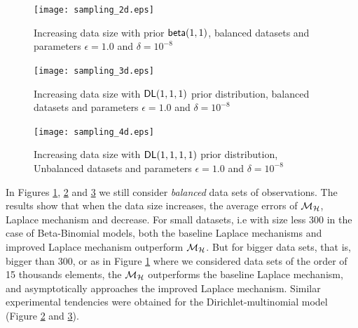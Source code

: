 \documentclass{article}
\begin{document}
\begin{figure}
\begin{center}
\centering
    \texttt{[image: sampling\_2d.eps]}
\caption{Increasing data size with prior $\mathsf{beta}(1,1)$, balanced datasets and parameters $\epsilon = 1.0$ and $\delta = 10^{-8}$}
\label{fig_vs_datasize_2d}
\end{center}
\end{figure}

\begin{figure}[ht]
\begin{center}
\centering
     \texttt{[image: sampling\_3d.eps]}   
\caption{Increasing data size with $\mathsf{DL}(1,1,1)$ prior distribution, balanced datasets and parameters $\epsilon = 1.0$ and $\delta = 10^{-8}$}
\label{fig_vs_datasize_3d}
\end{center}
\end{figure}

\begin{figure}[ht]
\begin{center}
\centering
     \texttt{[image: sampling\_4d.eps]}    
\caption{Increasing data size with $\mathsf{DL}(1,1,1,1)$ prior distribution, Unbalanced datasets and parameters $\epsilon = 1.0$ and $\delta = 10^{-8}$}
\label{fig_vs_datasize_4d}
\end{center}
\end{figure}

In Figures \ref{fig_vs_datasize_2d}, \ref{fig_vs_datasize_3d} and \ref{fig_vs_datasize_4d} we still consider \emph{balanced} data sets
of observations. The results show that when the data size increases, the average errors of
$\mathcal{M}_{\mathcal{H}}$, Laplace mechanism and decrease. For small datasets,
i.e with size less $300$ in the case of Beta-Binomial models,
both the baseline Laplace mechanisms and improved Laplace mechanism outperform $\mathcal{M}_{\mathcal{H}}$.
But for bigger data sets, that is, bigger than $300$, or as in Figure \ref{fig_vs_datasize_2d} where
we considered data sets of the order of 15 thousands elements,
the $\mathcal{M}_{\mathcal{H}}$ outperforms the baseline Laplace mechanism, and asymptotically approaches the improved Laplace mechanism.
Similar experimental tendencies were obtained for the Dirichlet-multinomial model (Figure \ref{fig_vs_datasize_3d} and \ref{fig_vs_datasize_4d}).
\end{document}
